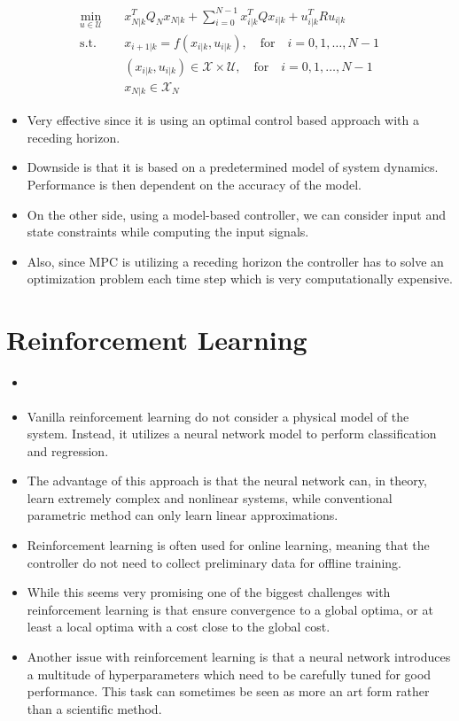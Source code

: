 \documentclass[english]{kththesis}
\newcommand{\X}{\mathcal{X}}
\newcommand{\U}{\mathcal{U}}
\begin{document}
\begin{equation}\begin{split}
    \min_{u \in \U} \quad &x_{N|k}^T Q_N x_{N|k} + \sum_{i=0}^{N-1} x_{i|k}^T Q x_{i|k} + u_{i|k}^T R u_{i|k} \\
    \text{s.t.} \quad &x_{i+1|k} = f(x_{i|k}, u_{i|k}), \quad \text{for} \quad i = 0, 1, \dots, N-1 \\
    &(x_{i|k}, u_{i|k}) \in \X \times \U, \quad \text{for} \quad i = 0, 1, \dots, N-1 \\
    &x_{N|k} \in \X_N
\end{split}\end{equation}

\begin{itemize}
    \item Very effective since it is using an optimal control based approach with a receding horizon.
    \item Downside is that it is based on a predetermined model of system dynamics. Performance is then dependent on the accuracy of the model.
    \item On the other side, using a model-based controller, we can consider input and state constraints while computing the input signals.
    \item Also, since MPC is utilizing a receding horizon the controller has to solve an optimization problem each time step which is very computationally expensive.
\end{itemize}

\section{Reinforcement Learning}

\begin{itemize}
    \item \cite{arulkumaran2017}
    \item Vanilla reinforcement learning do not consider a physical model of the system. Instead, it utilizes a neural network model to perform classification and regression.
    \item The advantage of this approach is that the neural network can, in theory, learn extremely complex and nonlinear systems, while conventional parametric method can only learn linear approximations.
    \item Reinforcement learning is often used for online learning, meaning that the controller do not need to collect preliminary data for offline training.
    \item While this seems very promising one of the biggest challenges with reinforcement learning is that ensure convergence to a global optima, or at least a local optima with a cost close to the global cost.
    \item Another issue with reinforcement learning is that a neural network introduces a multitude of hyperparameters which need to be carefully tuned for good performance. This task can sometimes be seen as more an art form rather than a scientific method.
\end{itemize}
\end{document}
